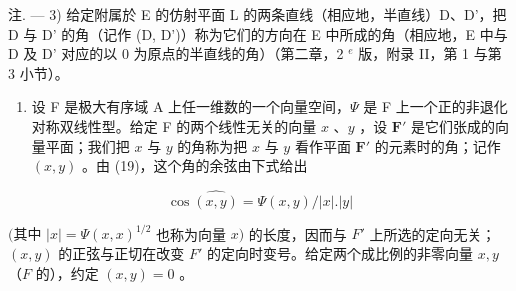 注. --- 3) 给定附属於 E 的仿射平面 L 的两条直线（相应地，半直线）D、D'，把 D 与 D' 的角（记作 (D, D')）称为它们的方向在 E 中所成的角（相应地，E 中与 D 及 D' 对应的以 0 为原点的半直线的角）（第二章，2 \(^{e}\) 版，附录 II，第 1 与第 3 小节）。

\begin{enumerate}
\def\labelenumi{\arabic{enumi})}
\setcounter{enumi}{3}
\tightlist
\item
  设 F 是极大有序域 A 上任一维数的一个向量空间，\(\Psi\) 是 F 上一个正的非退化对称双线性型。给定 F 的两个线性无关的向量 \(x\) 、\(y\) ，设 \(\mathbf{F}'\) 是它们张成的向量平面；我们把 \(x\) 与 \(y\) 的角称为把 \(x\) 与 \(y\) 看作平面 \(\mathbf{F}'\) 的元素时的角；记作 \((x,y)\) 。由 (19)，这个角的余弦由下式给出
\end{enumerate}

\[
\cos \widehat {(x , y)} = \Psi (x, y) / | x |. | y |\tag{21}
\]

\((\text{其中 } |x| = \Psi(x, x)^{1/2}\) 也称为向量 \(x)\) 的长度，因而与 \(F'\) 上所选的定向无关；\((x, y)\) 的正弦与正切在改变 \(F'\) 的定向时变号。给定两个成比例的非零向量 \(x, y\) （\(F\) 的），约定 \((x, y) = 0\) 。
\relax{}
